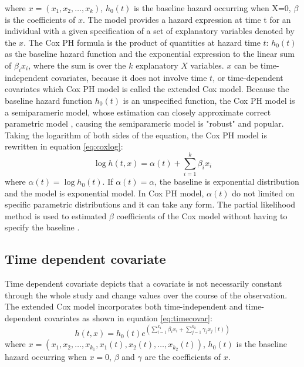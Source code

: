where $x=(x_1, x_2, \ldots, x_k)$, $h_0(t)$ is the baseline hazard occurring when X=0, $\beta$ is the coefficients of $x$. 
The model provides a hazard expression at time t for an individual with a given specification of a set of explanatory variables denoted by the $x$. The Cox PH formula is the product of quantities at hazard time $t$: $h_0 (t)$ as the baseline hazard function and the exponential expression to the linear sum of $\beta_i x_i$, where the sum is over the $k$ explanatory $X$ variables. $x$ can be time-independent covariates, because it does not involve time $t$, or time-dependent covariates which Cox PH model is called the extended Cox model. Because the baseline hazard function $h_0 (t)$ is an unspecified function, the Cox PH model is a semiparameric model, whose estimation can closely approximate correct parametric model \citep{kleinbaum1998}, causing the semiparameric model is "robust" and popular. Taking the logarithm of both sides of the equation, the Cox PH model is rewritten in equation \ref{eq:coxlog}:
\begin{equation}
\label{eq:coxlog}
\log{h(t,x)}=\alpha(t)+\sum_{i=1}^{k}\beta_ix_i 
\end{equation}
where $\alpha(t)=\log{h_0(t)}$. If $\alpha(t)=\alpha$, the baseline is exponential distribution and the model is exponential model. In Cox PH model, $\alpha(t)$ do not limited on specific parametric distributions and it can take any form. The partial likelihood method is used to estimated $\beta$ coefficients of the Cox model without having to specify the baseline \citep{allison1995}.
\subsection{Time dependent covariate}
Time dependent covariate depicts that a covariate is not necessarily constant through the whole study and change values over the course of the observation. The extended Cox model incorporates both time-independent and time-dependent covariates as shown in equation \ref{eq:timecovar}:
\begin{equation}
\label{eq:timecovar}
h(t,x)=h_0(t)e^{(\sum_{i=1}^{k_1}\beta_ix_i+\sum_{j=1}^{k_2}\gamma_jx_j(t))}
\end{equation}
where $x=(x_1, x_2, \ldots, x_{k_1}, x_1(t), x_2(t), \ldots, x_{k_2}(t))$, $h_0(t)$ is the baseline hazard occurring when $x=0$, $\beta$ and $\gamma$ are the coefficients of $x$. 
